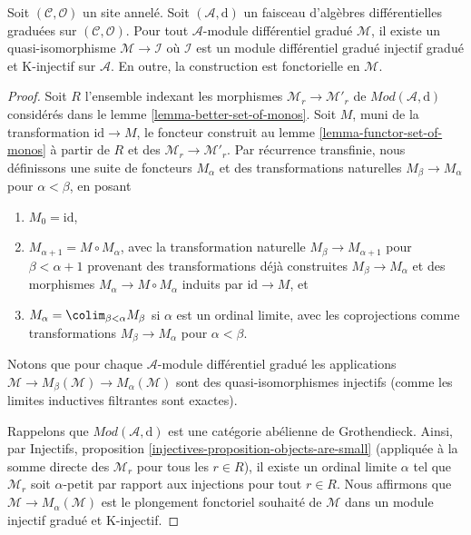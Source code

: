 \begin{theorem}
\label{theorem-qis-into-dg-injective}
Soit $(\mathcal{C}, \mathcal{O})$ un site annelé. Soit
$(\mathcal{A}, \text{d})$ un
faisceau d'algèbres différentielles graduées sur $(\mathcal{C}, \mathcal{O})$.
Pour tout $\mathcal{A}$-module différentiel gradué $\mathcal{M}$, il
existe un quasi-isomorphisme $\mathcal{M} \to \mathcal{I}$
où $\mathcal{I}$ est un module différentiel gradué injectif
gradué et K-injectif sur $\mathcal{A}$. En outre, la
construction est fonctorielle en $\mathcal{M}$.
\end{theorem}

\begin{proof}
Soit $R$ l'ensemble indexant les morphismes $\mathcal{M}_r \to \mathcal{M}'_r$ de
$\textit{Mod}(\mathcal{A}, \text{d})$
considérés dans le lemme \ref{lemma-better-set-of-monos}. Soit
$M$, muni de la transformation $\text{id} \to M$, le
foncteur construit au lemme \ref{lemma-functor-set-of-monos} à
partir de $R$ et des $\mathcal{M}_r \to \mathcal{M}'_r$.
Par récurrence transfinie, nous définissons une suite de foncteurs
$M_\alpha$ et des transformations naturelles $M_\beta \to M_\alpha$
pour $\alpha < \beta$, en posant
\begin{enumerate}
\item $M_0 = \text{id}$,
\item $M_{\alpha + 1} = M \circ M_\alpha$, avec la transformation naturelle
$M_\beta \to M_{\alpha + 1}$ pour $\beta < \alpha + 1$
provenant des transformations déjà construites $M_\beta \to M_\alpha$ et des
morphismes $M_\alpha \to M \circ M_\alpha$ induits par $\text{id} \to M$, et
\item $M_\alpha = \colim_{\beta < \alpha} M_\beta$ si $\alpha$ est un
ordinal limite, avec les coprojections comme transformations
$M_\beta \to M_\alpha$ pour $\alpha < \beta$.
\end{enumerate} Notons que
pour chaque $\mathcal{A}$-module différentiel gradué les applications
$\mathcal{M} \to M_\beta(\mathcal{M}) \to M_\alpha(\mathcal{M})$ sont des
quasi-isomorphismes injectifs (comme les limites inductives filtrantes sont exactes).

\medskip\noindent
Rappelons que $\textit{Mod}(\mathcal{A}, \text{d})$ est une catégorie
abélienne de Grothendieck. Ainsi,
par Injectifs, proposition \ref{injectives-proposition-objects-are-small}
(appliquée à la somme directe des $\mathcal{M}_r$ pour tous les $r \in R$),
il existe un ordinal limite $\alpha$ tel que $\mathcal{M}_r$ soit $\alpha$-petit
par rapport aux injections pour tout $r \in R$.
Nous affirmons que $\mathcal{M} \to M_\alpha(\mathcal{M})$
est le plongement fonctoriel souhaité de $\mathcal{M}$ dans un
module injectif gradué et K-injectif.


\end{proof}
